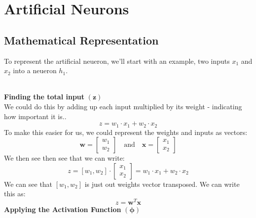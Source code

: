 \documentclass[9pt]{extarticle}
\begin{document}
\pagebreak

\section{Artificial Neurons}

\subsection{Mathematical Representation}
To represent the artificial neueron, we'll start with an example, two inputs $x_1$ and $x_2$ into a neueron $h_1$.
\begin{figure}[h]
    \centering
\end{figure} \\
\textbf{Finding the total input} $\mathbf{(z)}$\\[2ex]
We could do this by adding up each input multiplied by its weight - indicating how important it is..
$$z = w_1 \cdot x_1 + w_2 \cdot x_2$$
To make this easier for us, we could represent the weights and inputs as vectors:
$$\mathbf{w} = \begin{bmatrix} w_1 \\ w_2 \end{bmatrix} \quad \text{and} \quad \mathbf{x} = \begin{bmatrix} x_1 \\ x_2 \end{bmatrix}$$
We then see then see that we can write:
$$z = [w_1, w_2] \cdot \begin{bmatrix} x_1 \\ x_2 \end{bmatrix} = w_1 \cdot x_1 + w_2 \cdot x_2$$
We can see that $[w_1, w_2]$ is just out weights vector transposed. We can write this as:
$$z = \mathbf{w}^T \mathbf{x}$$
\textbf{Applying the Activation Function} $\boldsymbol{(\phi)}$\\[2ex]
\end{document}

